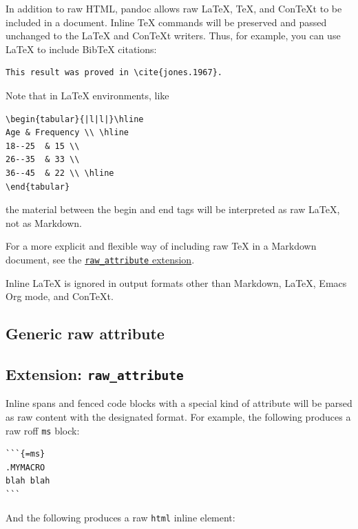 \documentclass[
  b5paper
]{book}
\begin{document}
In addition to raw HTML, pandoc allows raw LaTeX, TeX, and ConTeXt to be
included in a document. Inline TeX commands will be preserved and passed
unchanged to the LaTeX and ConTeXt writers. Thus, for example, you can
use LaTeX to include BibTeX citations:

\begin{verbatim}
This result was proved in \cite{jones.1967}.
\end{verbatim}

Note that in LaTeX environments, like

\begin{verbatim}
\begin{tabular}{|l|l|}\hline
Age & Frequency \\ \hline
18--25  & 15 \\
26--35  & 33 \\
36--45  & 22 \\ \hline
\end{tabular}
\end{verbatim}

the material between the begin and end tags will be interpreted as raw
LaTeX, not as Markdown.

For a more explicit and flexible way of including raw TeX in a Markdown
document, see the
\hyperref[extension-raw_attribute]{\texttt{raw\_attribute} extension}.

Inline LaTeX is ignored in output formats other than Markdown, LaTeX,
Emacs Org mode, and ConTeXt.

\subsection{Generic raw attribute}\label{generic-raw-attribute}

\subsection{\texorpdfstring{Extension:
\texttt{raw\_attribute}}{Extension: raw\_attribute}}\label{extension-raw_attribute}

Inline spans and fenced code blocks with a special kind of attribute
will be parsed as raw content with the designated format. For example,
the following produces a raw roff \texttt{ms} block:

\begin{verbatim}
```{=ms}
.MYMACRO
blah blah
```
\end{verbatim}

And the following produces a raw \texttt{html} inline element:
\end{document}
